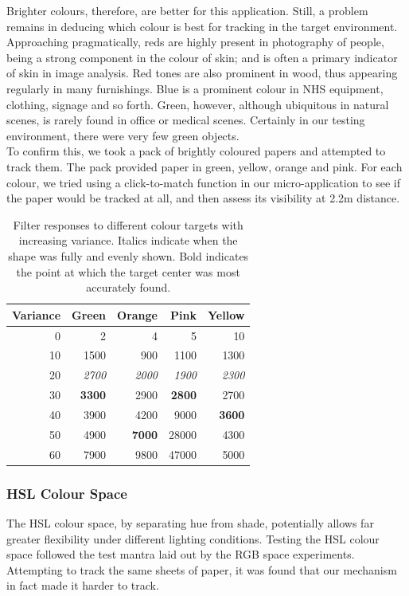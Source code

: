 Brighter colours, therefore, are better for this application. Still, a problem remains in deducing which colour is best for tracking in the target environment. Approaching pragmatically, reds are highly present in photography of people, being a strong component in the colour of skin; and is often a primary indicator of skin in image analysis. Red tones are also prominent in wood, thus appearing regularly in many furnishings. Blue is a prominent colour in NHS equipment, clothing, signage and so forth. Green, however, although ubiquitous in natural scenes, is rarely found in office or medical scenes. Certainly in our testing environment, there were very few green objects.\\

To confirm this, we took a pack of brightly coloured papers and attempted to track them. The pack provided paper in green, yellow, orange and pink. For each colour, we tried using a click-to-match function in our micro-application to see if the paper would be tracked at all, and then assess its visibility at 2.2m distance.\\

\begin{table}
\centering
  \begin{tabular}{| r | r | r | r | r |}
    \hline
    Variance & Green & Orange & Pink & Yellow \\ \hline
    0 & 2 & 4 & 5 & 10\\ \hline
    10 & 1500 & 900 & 1100 & 1300\\ \hline
    20 & \textit{2700} & \textit{2000} & \textit{1900} & \textit{2300}\\ \hline
    30 & \textbf{3300} & 2900 & \textbf{2800} & 2700\\ \hline
    40 & 3900 & 4200 & 9000 & \textbf{3600}\\ \hline
    50 & 4900 & \textbf{7000} & 28000 & 4300\\ \hline
    60 & 7900 & 9800 & 47000 & 5000\\ \hline
  \end{tabular}
    \caption{Filter responses to different colour targets with increasing variance. Italics indicate when the shape was fully and evenly shown. Bold indicates the point at which the target center was most accurately found.}
\end{table}


\subsubsection{HSL Colour Space}
The HSL colour space, by separating hue from shade, potentially allows far greater flexibility under different lighting conditions.
Testing the HSL colour space followed the test mantra laid out by the RGB space experiments. Attempting to track the same sheets of paper, it was found that our mechanism in fact made it harder to track. \\


